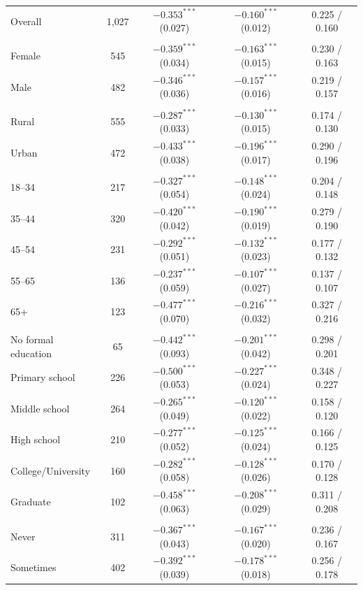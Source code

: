 \documentclass[preprint,12pt]{elsarticle}
\begin{document}
\begin{longtable}{lcccc}
Overall & 1{,}027 & $-0.353^{***}$ (0.027) & $-0.160^{***}$ (0.012) & 0.225 / 0.160 \\
\addlinespace
\multicolumn{5}{l}{\textit{Gender}}\\
Female & 545 & $-0.359^{***}$ (0.034) & $-0.163^{***}$ (0.015) & 0.230 / 0.163 \\
Male & 482 & $-0.346^{***}$ (0.036) & $-0.157^{***}$ (0.016) & 0.219 / 0.157 \\
\addlinespace
\multicolumn{5}{l}{\textit{Residence}}\\
Rural & 555 & $-0.287^{***}$ (0.033) & $-0.130^{***}$ (0.015) & 0.174 / 0.130 \\
Urban & 472 & $-0.433^{***}$ (0.038) & $-0.196^{***}$ (0.017) & 0.290 / 0.196 \\
\addlinespace
\multicolumn{5}{l}{\textit{Age group}}\\
18--34 & 217 & $-0.327^{***}$ (0.054) & $-0.148^{***}$ (0.024) & 0.204 / 0.148 \\
35--44 & 320 & $-0.420^{***}$ (0.042) & $-0.190^{***}$ (0.019) & 0.279 / 0.190 \\
45--54 & 231 & $-0.292^{***}$ (0.051) & $-0.132^{***}$ (0.023) & 0.177 / 0.132 \\
55--65 & 136 & $-0.237^{***}$ (0.059) & $-0.107^{***}$ (0.027) & 0.137 / 0.107 \\
65+ & 123 & $-0.477^{***}$ (0.070) & $-0.216^{***}$ (0.032) & 0.327 / 0.216 \\
\addlinespace
\multicolumn{5}{l}{\textit{Education}}\\
No formal education & 65 & $-0.442^{***}$ (0.093) & $-0.201^{***}$ (0.042) & 0.298 / 0.201 \\
Primary school & 226 & $-0.500^{***}$ (0.053) & $-0.227^{***}$ (0.024) & 0.348 / 0.227 \\
Middle school & 264 & $-0.265^{***}$ (0.049) & $-0.120^{***}$ (0.022) & 0.158 / 0.120 \\
High school & 210 & $-0.277^{***}$ (0.052) & $-0.125^{***}$ (0.024) & 0.166 / 0.125 \\
College/University & 160 & $-0.282^{***}$ (0.058) & $-0.128^{***}$ (0.026) & 0.170 / 0.128 \\
Graduate & 102 & $-0.458^{***}$ (0.063) & $-0.208^{***}$ (0.029) & 0.311 / 0.208 \\
\addlinespace
\multicolumn{5}{l}{\textit{Smoking status}}\\
Never & 311 & $-0.367^{***}$ (0.043) & $-0.167^{***}$ (0.020) & 0.236 / 0.167 \\
Sometimes & 402 & $-0.392^{***}$ (0.039) & $-0.178^{***}$ (0.018) & 0.256 / 0.178 \\

\end{longtable}
\end{document}
